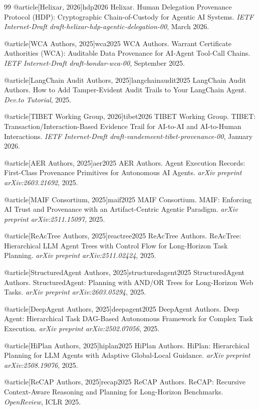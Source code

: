 \begin{thebibliography}{99}
@article[Helixar, 2026]{hdp2026}
Helixar. \newblock Human Delegation Provenance Protocol (HDP): Cryptographic Chain-of-Custody for Agentic AI Systems.
\newblock \emph{IETF Internet-Draft draft-helixar-hdp-agentic-delegation-00}, March 2026.

@article[WCA Authors, 2025]{wca2025}
WCA Authors. \newblock Warrant Certificate Authorities (WCA): Auditable Data Provenance for AI-Agent Tool-Call Chains.
\newblock \emph{IETF Internet-Draft draft-bondar-wca-00}, September 2025.

@article[LangChain Audit Authors, 2025]{langchainaudit2025}
LangChain Audit Authors. \newblock How to Add Tamper-Evident Audit Trails to Your LangChain Agent.
\newblock \emph{Dev.to Tutorial}, 2025.

@article[TIBET Working Group, 2026]{tibet2026}
TIBET Working Group. \newblock TIBET: Transaction/Interaction-Based Evidence Trail for AI-to-AI and AI-to-Human Interactions.
\newblock \emph{IETF Internet-Draft draft-vandemeent-tibet-provenance-00}, January 2026.

@article[AER Authors, 2025]{aer2025}
AER Authors. \newblock Agent Execution Records: First-Class Provenance Primitives for Autonomous AI Agents.
\newblock \emph{arXiv preprint arXiv:2603.21692}, 2025.

@article[MAIF Consortium, 2025]{maif2025}
MAIF Consortium. \newblock MAIF: Enforcing AI Trust and Provenance with an Artifact-Centric Agentic Paradigm.
\newblock \emph{arXiv preprint arXiv:2511.15097}, 2025.

@article[ReAcTree Authors, 2025]{reactree2025}
ReAcTree Authors. \newblock ReAcTree: Hierarchical LLM Agent Trees with Control Flow for Long-Horizon Task Planning.
\newblock \emph{arXiv preprint arXiv:2511.02424}, 2025.

@article[StructuredAgent Authors, 2025]{structuredagent2025}
StructuredAgent Authors. \newblock StructuredAgent: Planning with AND/OR Trees for Long-Horizon Web Tasks.
\newblock \emph{arXiv preprint arXiv:2603.05294}, 2025.

@article[DeepAgent Authors, 2025]{deepagent2025}
DeepAgent Authors. \newblock Deep Agent: Hierarchical Task DAG-Based Autonomous Framework for Complex Task Execution.
\newblock \emph{arXiv preprint arXiv:2502.07056}, 2025.

@article[HiPlan Authors, 2025]{hiplan2025}
HiPlan Authors. \newblock HiPlan: Hierarchical Planning for LLM Agents with Adaptive Global-Local Guidance.
\newblock \emph{arXiv preprint arXiv:2508.19076}, 2025.

@article[ReCAP Authors, 2025]{recap2025}
ReCAP Authors. \newblock ReCAP: Recursive Context-Aware Reasoning and Planning for Long-Horizon Benchmarks.
\newblock \emph{OpenReview}, ICLR 2025.

\end{thebibliography}
